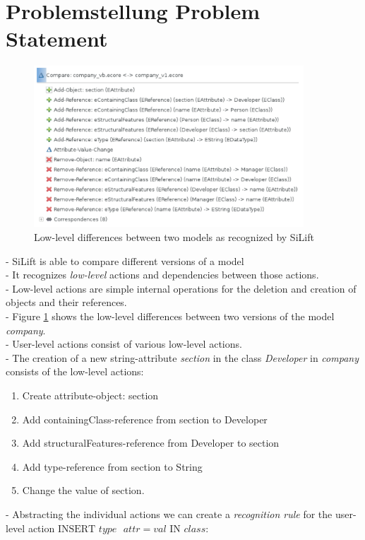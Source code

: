\documentclass[10pt,a4paper,oneside]{scrartcl}
\begin{document}
	\section{
		{Problemstellung}
		{Problem Statement}}
	\label{sec:problem_statement}
	\begin{figure}
		\centering
		\includegraphics[width=0.9\textwidth]{./res/low-level-actions.png}
		\caption{Low-level differences between two models as recognized by SiLift}
		\label{fig:SiLiftEx}
	\end{figure}
	- SiLift is able to compare different versions of a model
	\\
	- It recognizes \textit{low-level} actions and dependencies between those actions.
	\\
	- Low-level actions are simple internal operations for the deletion and creation of objects and their references.
	\\
	- Figure \ref{fig:SiLiftEx} shows the low-level differences between two versions of the model \textit{company}.
	\\
	- User-level actions consist of various low-level actions.
	\\
	- The creation of a new string-attribute \textit{section} in the class \textit{Developer} in \textit{company} consists of the low-level actions:
	\begin{enumerate}
		\item Create attribute-object: section
		\item Add containingClass-reference from section to Developer
		\item Add structuralFeatures-reference from Developer to section
		\item Add type-reference from section to String
		\item Change the value of section.
	\end{enumerate}
	- Abstracting the individual actions we can create a \textit{recognition rule} for the user-level action
	$ \text{INSERT } type \text{ } attr = val \text{ IN } class$:
	
\end{document}

